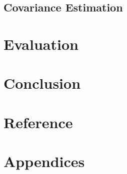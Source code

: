 \documentclass[a4paper]{report}
\numberwithin{figure}{section}
\begin{document}
\section{Covariance Estimation} \label{sc_covariance_estim}

\chapter{Evaluation} \label{cp_evaluation}

\chapter{Conclusion} \label{cp_conc}

\chapter{Reference} \label{cp_ref}


\chapter{Appendices} \label{cp_appendices}
\end{document}
